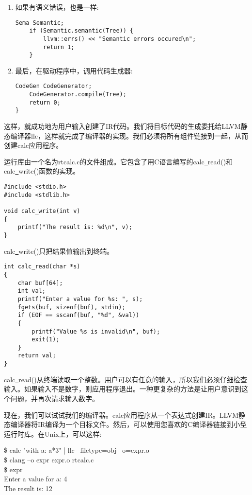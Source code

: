 \begin{enumerate}
\item 如果有语义错误，也是一样:
\begin{lstlisting}[caption={}]
	Sema Semantic;
	if (Semantic.semantic(Tree)) {
		llvm::errs() << "Semantic errors occured\n";
		return 1;
	}
\end{lstlisting}

\item 最后，在驱动程序中，调用代码生成器:
\begin{lstlisting}[caption={}]
	CodeGen CodeGenerator;
	CodeGenerator.compile(Tree);
	return 0;
}
\end{lstlisting}

\end{enumerate}

这样，就成功地为用户输入创建了IR代码。我们将目标代码的生成委托给LLVM静态编译器llc，这样就完成了编译器的实现。我们必须将所有组件链接到一起，从而创建calc应用程序。\par

运行库由一个名为rtcalc.c的文件组成。它包含了用C语言编写的calc\underline{~}read()和calc\underline{~}write()函数的实现。\par

\begin{lstlisting}[caption={}]
#include <stdio.h>
#include <stdlib.h>

void calc_write(int v)
{
	printf("The result is: %d\n", v);
}
\end{lstlisting}

calc\underline{~}write()只把结果值输出到终端。

\begin{lstlisting}[caption={}]
int calc_read(char *s)
{
	char buf[64];
	int val;
	printf("Enter a value for %s: ", s);
	fgets(buf, sizeof(buf), stdin);
	if (EOF == sscanf(buf, "%d", &val))
	{
		printf("Value %s is invalid\n", buf);
		exit(1);
	}
	return val;
}
\end{lstlisting}

calc\underline{~}read()从终端读取一个整数。用户可以有任意的输入，所以我们必须仔细检查输入。如果输入不是数字，则应用程序退出。一种更复杂的方法是让用户意识到这个问题，并再次请求输入数字。\par

现在，我们可以试试我们的编译器。calc应用程序从一个表达式创建IR。LLVM静态编译器将IR编译为一个目标文件。然后，可以使用您喜欢的C编译器链接到小型运行时库。在Unix上，可以这样:\par

\begin{tcolorbox}[colback=white,colframe=black]
\$ calc "with a: a*3" | llc –filetype=obj –o=expr.o \\
\$ clang –o expr expr.o rtcalc.c \\
\$ expr \\
\hspace*{0.5cm}Enter a value for a: 4 \\
\hspace*{0.5cm}The result is: 12
\end{tcolorbox}

